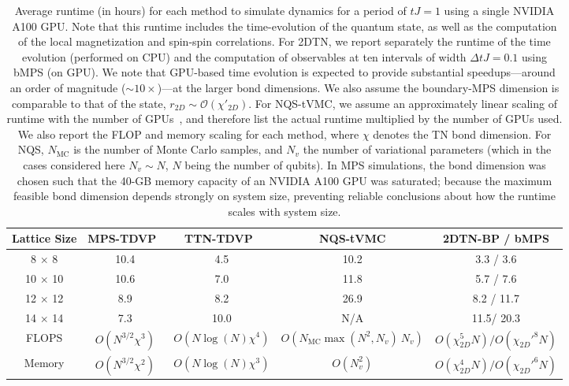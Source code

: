 \documentclass[aps,pra,reprint,amssymb,superscriptaddress]{revtex4-2}
\begin{document}
\begin{table}
    \centering
    \begin{tabular}{|c|c|c|c|c|}
        \hline
        Lattice Size & MPS-TDVP~\cite{paeckel_time-evolution_2019, stoudenmire_studying_2012} & TTN-TDVP~\cite{krinitsin_time_2025} & NQS-tVMC \cite{schmitt_jvmc_2022} & 2DTN-BP / bMPS \cite{tindall_gauging_2023, lubasch_algorithms_2014} \\
        \hline
        8 $\times$ 8   & 10.4 & 4.5 &     10.2             &       3.3 / 3.6             \\
        10 $\times$ 10 & 10.6 & 7.0 &       11.8           &   5.7 / 7.6                \\
        12 $\times$ 12 & 8.9 & 8.2 &       26.9           &    8.2  / 11.7              \\
        14 $\times$ 14 & 7.3 & 10.0 &       N/A           &       11.5/ 20.3             \\
        \hline
        \hline
        FLOPS & $O(N^{3/2} \chi^3)$ & $O(N \log(N) \chi^4)$ &    $O( N_{\mathrm{MC}}  \max(N^2,N_v) \ N_v)$  & $O(\chi_{2D}^{5}N) / O(\chi_{2D}'^{8}N)$
        \\
        Memory & $O( N^{3/2} \chi^2)$ & $O(N \log(N) \chi^3)$ &   $O(N_v^2)$   & $O(\chi_{2D}^{4}N) / O(\chi_{2D}'^{ 6}N)$
        \\
        \hline
        
    \end{tabular}
    \caption{Average runtime (in hours) for each method to simulate dynamics for a period of $tJ = 1$ using a single NVIDIA A100 GPU. Note that this runtime includes the time-evolution of the quantum state, as well as the computation of the local magnetization and spin-spin correlations. For 2DTN, we report separately the runtime of the time evolution (performed on CPU) and the computation of observables at ten intervals of width $\Delta tJ = 0.1$ using bMPS (on GPU). We note that GPU-based time evolution is expected to provide substantial speedups---around an order of magnitude ($\sim 10\times$)---at the larger bond dimensions. We also assume the boundary-MPS dimension is comparable to that of the state, $r_{2D} \sim \mathcal{O}(\chi'_{2D})$. For NQS-tVMC, we assume an approximately linear scaling of runtime with the number of GPUs~\cite{schmitt_jvmc_2022}, and therefore list the actual runtime multiplied by the number of GPUs used. We also report the FLOP and memory scaling for each method, where $\chi$ denotes the TN bond dimension. For NQS, $N_{\mathrm{MC}}$ is  the number of Monte Carlo samples, and $N_v$ the number of variational parameters (which in the cases considered here $N_v \sim N$, $N$ being the number of qubits). In MPS simulations, the bond dimension was chosen such that the 40-GB memory capacity of an NVIDIA A100 GPU was saturated; because the maximum feasible bond dimension depends strongly on system size, preventing reliable conclusions about how the runtime scales with system size.}
    \label{tab:runtimes}
\end{table}
\end{document}

